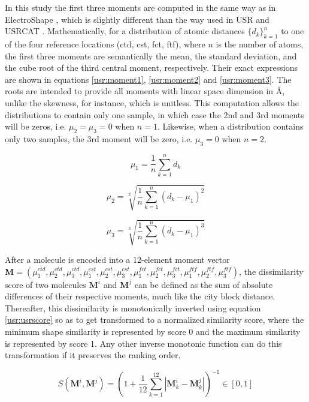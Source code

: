In this study the first three moments are computed in the same way as in ElectroShape \citep{1337}, which is slightly different than the way used in USR \citep{1379,1332,1380} and USRCAT \citep{1331}. Mathematically, for a distribution of atomic distances $\{d_k\}_{k=1}^n$ to one of the four reference locations (ctd, cst, fct, ftf), where $n$ is the number of atoms, the first three moments are semantically the mean, the standard deviation, and the cube root of the third central moment, respectively. Their exact expressions are shown in equations \eqref{usr:moment1}, \eqref{usr:moment2} and \eqref{usr:moment3}. The roots are intended to provide all moments with linear space dimension in \AA, unlike the skewness, for instance, which is unitless. This computation allows the distributions to contain only one sample, in which case the 2nd and 3rd moments will be zeros, i.e. $\mu_2=\mu_3=0$ when $n=1$. Likewise, when a distribution contains only two samples, the 3rd moment will be zero, i.e. $\mu_3=0$ when $n=2$.

\begin{equation}
\mu_1=\frac{1}{n}\sum_{k=1}^{n}{d_k}
\label{usr:moment1}
\end{equation}

\begin{equation}
\mu_2=\sqrt[2]{\frac{1}{n}\sum_{k=1}^{n}{(d_k-\mu_1)^2}}
\label{usr:moment2}
\end{equation}

\begin{equation}
\mu_3=\sqrt[3]{\frac{1}{n}\sum_{k=1}^{n}{(d_k-\mu_1)^3}}
\label{usr:moment3}
\end{equation}

After a molecule is encoded into a 12-element moment vector $\mathbf M=(\mu_1^{ctd}, \mu_2^{ctd}, \mu_3^{ctd}, \mu_1^{cst}, \mu_2^{cst}, \mu_3^{cst}, \mu_1^{fct}, \mu_2^{fct}, \mu_3^{fct}, \mu_1^{ftf}, \mu_2^{ftf}, \mu_3^{ftf})$, the dissimilarity score of two molecules $\mathbf M^i$ and $\mathbf M^j$ can be defined as the sum of absolute differences of their respective moments, much like the city block distance. Thereafter, this dissimilarity is monotonically inverted using equation \eqref{usr:usrscore} so as to get transformed to a normalized similarity score, where the minimum shape similarity is represented by score 0 and the maximum similarity is represented by score 1. Any other inverse monotonic function can do this transformation if it preserves the ranking order.

\begin{equation}
S(\mathbf M^i, \mathbf M^j)=(1+\frac{1}{12}\sum_{k=1}^{12}|\mathbf M_k^i-\mathbf M_k^j|)^{-1}\in[0, 1]
\label{usr:usrscore}
\end{equation}

